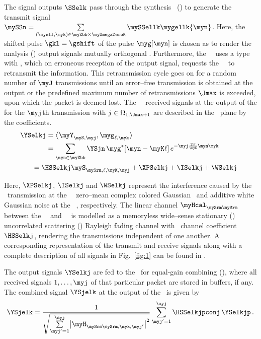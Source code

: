 The signal outputs $\SSelk$ pass through the synthesis \myFB\ (\mySFB{}) to generate the \mySU{} transmit signal
 $\mySSn = \sum\limits_{(\myell,\myk)\in\myZbb\times\myOmegaZeroK}
\mySSellk\mygellk{\myn}$. Here, the \myTF{} shifted pulse $\gkl = \gshift$ of the pulse $\myg[\myn]$ is chosen as to render the analysis \myFB{} (\myAFB{}) output signals mutually orthogonal \cite{Mansour2018_alt}. Furthermore, the \mySU\ \myRX\ uses a \myTHARQ{} type~\myII{} with \myCC{}, which on erroneous reception of the \myCC{} output signal, requests the \mySU\ \myTX\
to retransmit the information. This retransmission cycle goes on for a random number of $\myJ$ transmissions until an error–free transmission
is obtained at the \myCC{} output or the predefined maximum number of
retransmissions $\Jmax$ is exceeded, upon which the packet is deemed lost. The \mySU\ \myRX\ received signals at the output of the \myAFB{} for the $\myj$th
transmission with $j \in \Omega_{1,\Jmax+1}$ are described in the \myTF\
plane by the coefficients.
\vspace{-0.6em}
\begin{align*}
    \hspace{-1.2ex} \YSelkj 
    &= \bigl\langle \myY_{\myS,\myj}, \myg_{\ell,\myk} \bigr\rangle \\
    &= \sum_{\myn \in \myZbb} \YSjn \, \myg^{*}[\myn-\myK \ell] \, 
       e^{ -\myj \frac{2\pi}{\myK} \myn \myk} \\
    &\hspace{-0.7cm}= \HSSelkj \myS_{\mySrm,\ell,\myK,\myj} + \XPSelkj + \ISelkj + \WSelkj
\end{align*}
\vspace{-1.25em}

Here, $\XPSelkj$, $\ISelkj$ and $\WSelkj$ represent the interference caused by the \myPU\ transmission at the \mySU\ \myRX\, zero–mean complex colored Gaussian \myTPI\ and additive white Gaussian noise at the \mySU\ \myRX{}, respectively. The linear channel $\myHcal_{\mySrm\mySrm}$ between the \mySU\ \myTX\ and \mySU\ \myRX\ is modelled as a memoryless wide–sense stationary (\myWSS{}) uncorrelated scattering (\myUS{}) Rayleigh fading channel with \myTF\ channel coefficient $\HSSelkj$, rendering the transmissions independent of one another. A corresponding representation of the\! \myPU{}\! transmit and receive signals along with a complete description of all signals in Fig.~\ref{fig:1} can be found in \cite{Mansour2018_alt}.

\newpage 

The \myAFB{} output signals $\YSelkj$ are \!fed to \!the \myCC\ for equal-gain combining (\myEGC{}), where all received signals $1,\dots,\myj$ of that particular packet are stored in buffers, if any. The combined signal $\YSjelk$ at the output of the \myCC\ is given by
\begin{equation}
  \YSjelk
  = \frac{1}{%
      \sqrt{%
        \sum\limits_{{\myj}'=1}^{\myj} \bigl|\myH_{\mySrm\mySrm,\myk,{\myj}'}\bigr|^{2}%
      }%
    }
    \sum_{{\myj}'=1}^{\myj} \HSSelkjpconj \, \YSelkjp \, .
  \label{eq:1}
\end{equation}


